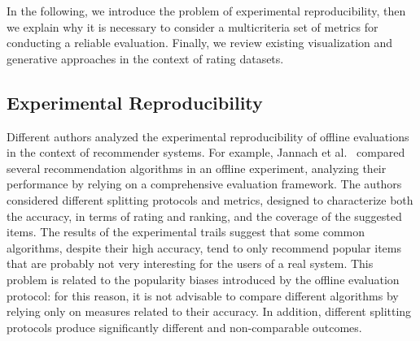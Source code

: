 
In the following, we introduce the problem of experimental reproducibility, then we explain why it is necessary to consider a multicriteria set of metrics for conducting a reliable evaluation. Finally, we review existing visualization and generative approaches in the context of rating datasets.

\subsection{Experimental Reproducibility}

Different authors analyzed the experimental reproducibility of offline evaluations in the context of recommender systems. For example, Jannach et al.~\cite{Jannach2015} compared several recommendation algorithms in an offline experiment, analyzing their performance by relying on a comprehensive evaluation framework. The authors considered different splitting protocols and metrics, designed to characterize both the accuracy, in terms of rating and ranking, and the coverage of the suggested items. The results of the experimental trails suggest that some common algorithms, despite their high accuracy, tend to only recommend popular items that are probably not very interesting for the users of a real system. This problem is related to the popularity biases introduced by the offline evaluation protocol: for this reason, it is not advisable to compare different algorithms by relying only on measures related to their accuracy. In addition, different splitting protocols produce significantly different and non-comparable outcomes.

